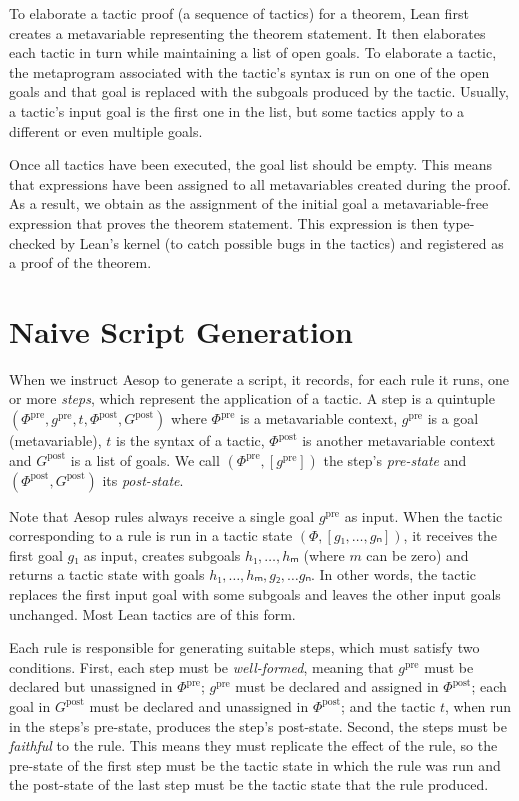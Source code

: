 \documentclass[sigplan,10pt,anonymous,review]{acmart}
\newcommand{\pre}{\mathrm{pre}}
\newcommand{\post}{\mathrm{post}}
\newcommand{\step}[5]{\ensuremath{(#1,\allowbreak #2,\allowbreak #3,\allowbreak #4,\allowbreak #5)}}
\begin{document}
To elaborate a tactic proof (a sequence of tactics) for a theorem, Lean first creates a metavariable representing the theorem statement.
It then elaborates each tactic in turn while maintaining a list of open goals.
To elaborate a tactic, the metaprogram associated with the tactic's syntax is run on one of the open goals and that goal is replaced with the subgoals produced by the tactic.
Usually, a tactic's input goal is the first one in the list, but some tactics apply to a different or even multiple goals.

Once all tactics have been executed, the goal list should be empty.
This means that expressions have been assigned to all metavariables created during the proof.
As a result, we obtain as the assignment of the initial goal a metavariable-free expression that proves the theorem statement.
This expression is then type-checked by Lean's kernel (to catch possible bugs in the tactics) and registered as a proof of the theorem.

\section{Naive Script Generation}%
\label{sec:generation}

When we instruct Aesop to generate a script, it records, for each rule it runs, one or more \emph{steps}, which represent the application of a tactic.
A step is a quintuple $\step{Φ^{\pre}}{g^{\pre}}{t}{Φ^{\post}}{G^{\post}}$ where $Φ^{\pre}$ is a metavariable context,
$g^{\pre}$ is a goal (metavariable),
$t$ is the syntax of a tactic,
$Φ^{\post}$ is another metavariable context and $G^{\post}$ is a list of goals.
We call $(Φ^{\pre}, [g^{\pre}])$ the step's \emph{pre-state} and $(Φ^{\post}, G^{\post})$ its \emph{post-state}.

Note that Aesop rules always receive a single goal $g^{\pre}$ as input.
When the tactic corresponding to a rule is run in a tactic state $(Φ,\allowbreak [g₁, \dots, gₙ])$, it receives the first goal $g₁$ as input, creates subgoals $h₁, \dots, hₘ$ (where $m$ can be zero) and returns a tactic state with goals $h₁, \dots, hₘ, g₂, \dots gₙ$.
In other words, the tactic replaces the first input goal with some subgoals and leaves the other input goals unchanged.
Most Lean tactics are of this form.

Each rule is responsible for generating suitable steps, which must satisfy two conditions.
First, each step must be \emph{well-formed}, meaning that $g^{\pre}$ must be declared but unassigned in $Φ^{\pre}$; $g^{\pre}$ must be declared and assigned in $Φ^{\post}$; each goal in $G^{\post}$ must be declared and unassigned in $Φ^{\post}$; and the tactic $t$, when run in the steps's pre-state, produces the step's post-state.
Second, the steps must be \emph{faithful} to the rule.
This means they must replicate the effect of the rule, so the pre-state of the first step must be the tactic state in which the rule was run and the post-state of the last step must be the tactic state that the rule produced.
\end{document}
